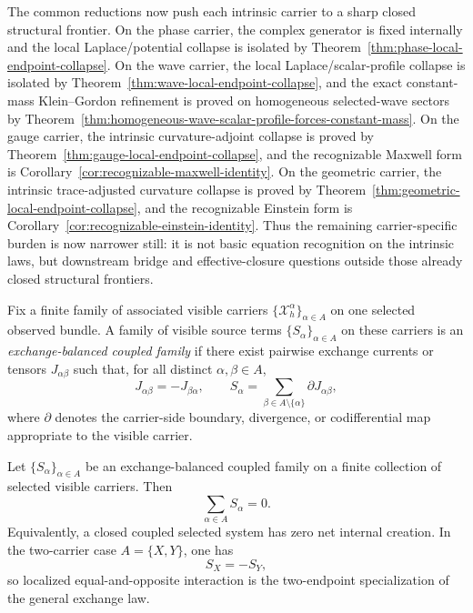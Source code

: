 \begin{remark}
\label{rem:active-intrinsic-frontier}
The common reductions now push each intrinsic carrier to a sharp closed
structural frontier.
On the phase carrier, the complex generator is fixed internally and the local
Laplace/potential collapse is isolated by
Theorem~\ref{thm:phase-local-endpoint-collapse}. On the wave carrier, the local
Laplace/scalar-profile collapse is isolated by
Theorem~\ref{thm:wave-local-endpoint-collapse}, and the exact constant-mass
Klein--Gordon refinement is proved on homogeneous selected-wave sectors by
Theorem~\ref{thm:homogeneous-wave-scalar-profile-forces-constant-mass}. On the
gauge carrier, the intrinsic curvature-adjoint collapse is proved by
Theorem~\ref{thm:gauge-local-endpoint-collapse}, and the recognizable Maxwell
form is Corollary~\ref{cor:recognizable-maxwell-identity}. On the geometric
carrier, the intrinsic trace-adjusted curvature collapse is proved by
Theorem~\ref{thm:geometric-local-endpoint-collapse}, and the recognizable
Einstein form is Corollary~\ref{cor:recognizable-einstein-identity}. Thus
the remaining
carrier-specific burden is now narrower still: it is not basic equation
recognition on the intrinsic laws, but downstream bridge and effective-closure
questions outside those already closed structural frontiers.
\end{remark}

\begin{definition}
\label{def:exchange-balanced-coupled-family}
Fix a finite family of associated visible carriers
\(\{\mathcal X_h^\alpha\}_{\alpha\in A}\) on one selected observed bundle. A
family of visible source terms \(\{S_\alpha\}_{\alpha\in A}\) on these carriers
is an \emph{exchange-balanced coupled family} if there exist pairwise exchange
currents or tensors \(J_{\alpha\beta}\) such that, for all distinct
\(\alpha,\beta\in A\),
\[
J_{\alpha\beta}=-J_{\beta\alpha},
\qquad
S_\alpha=\sum_{\beta\in A\setminus\{\alpha\}} \partial J_{\alpha\beta},
\]
where \(\partial\) denotes the carrier-side boundary, divergence, or
codifferential map appropriate to the visible carrier.
\end{definition}

\begin{theorem}
\label{thm:coupled-exchange-balance}
Let \(\{S_\alpha\}_{\alpha\in A}\) be an exchange-balanced coupled family on a
finite collection of selected visible carriers. Then
\[
\sum_{\alpha\in A} S_\alpha = 0.
\]
Equivalently, a closed coupled selected system has zero net internal creation.
In the two-carrier case \(A=\{X,Y\}\), one has
\[
S_X=-S_Y,
\]
so localized equal-and-opposite interaction is the two-endpoint specialization
of the general exchange law.
\end{theorem}

